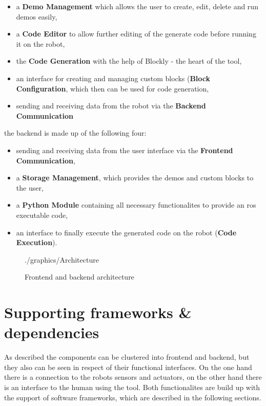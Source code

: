 \begin{itemize}
	\item a \textbf{Demo Management} which allows the user to create, edit, delete and run demos easily,
	\item a \textbf{Code Editor} to allow further editing of the generate code before running it on the robot,
	\item the \textbf{Code Generation} with the help of Blockly - the heart of the tool,
	\item an interface for creating and managing custom blocks (\textbf{Block Configuration}, which then can be used for code generation,
	\item sending and receiving data from the robot via the \textbf{Backend Communication}
\end{itemize}

the backend is made up of the following four:

\begin{itemize}
	\item sending and receiving data from the user interface via the \textbf{Frontend Communication},
	\item a \textbf{Storage Management}, which provides the demos and custom blocks to the user,
	\item a \textbf{Python Module} containing all necessary functionalites to provide an \gls{ros} executable code,
	\item an interface to finally execute the generated code on the robot (\textbf{Code Execution}).
\end{itemize}


\begin{figure}[htbp]
	\centering
	\begin{overpic}[width=\linewidth]{./graphics/Architecture}
	\end{overpic}
	\caption{Frontend and backend architecture}%
	\label{fig:Architecture}%
\end{figure}

\section{Supporting frameworks \& dependencies}
As described the components can be clustered into frontend and backend, but they also can be seen in respect of their functional interfaces. On the one hand there is a connection to the robots sensors and actuators, on the other hand there is an interface to the human using the tool. Both functionalites are build up with the support of software frameworks, which are described in the following sections.


